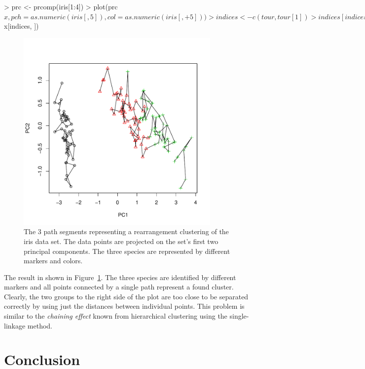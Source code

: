 \documentclass[10pt,a4paper,fleqn]{article}
\begin{document}
\begin{Schunk}
\begin{Sinput}
> prc <- prcomp(iris[1:4])
> plot(prc$x, pch = as.numeric(iris[, 5]), col = as.numeric(iris[, 
+     5]))
> indices <- c(tour, tour[1])
> indices[indices > 150] <- NA
> lines(prc$x[indices, ])
\end{Sinput}
\end{Schunk}

\begin{figure}
\centering
\includegraphics[width=10cm, trim=0 20 0 0]{TSP-clustering2}
\caption{The 3 path segments representing a rearrangement clustering of the
iris data set.  The data points are projected on the set's first two principal
components.  The three species are represented by different markers and
colors.}
\label{fig:clustering2}
\end{figure}

The result in shown in Figure~\ref{fig:clustering2}. The three species are
identified by different markers and all points connected by a single path
represent a found cluster.  Clearly, the two groups to the right side of the
plot are too close to be separated correctly by using just the distances
between individual points.  This problem is similar to the \emph{chaining
effect} known from hierarchical clustering using the single-linkage
method.





\section{Conclusion}\label{sec:conclusion}
\end{document}
